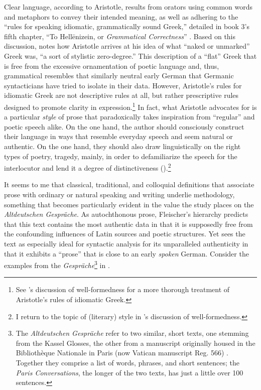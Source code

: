 \noindent Clear language, according to Aristotle, results from orators using common words and metaphors to convey their intended meaning, as well as adhering to the “rules for speaking idiomatic, grammatically sound Greek,” detailed in book 3’s fifth chapter, “To Hellēnizein, or \textit{Grammatical Correctness}” \citep[314--315]{Graff2005}. Based on this discussion, \citet[314]{Graff2005} notes how Aristotle arrives at his idea of what “naked or unmarked” Greek was, “a sort of stylistic zero-degree.” This description of a “flat” Greek that is free from the excessive ornamentation of poetic language and, thus, grammatical resembles that similarly neutral early German that Germanic syntacticians have tried to isolate in their data. However, Aristotle’s rules for idiomatic Greek are not descriptive rules at all, but rather prescriptive rules designed to promote clarity in expression.\footnote{{See ’s discussion of well-formedness for a more thorough treatment of Aristotle’s rules of idiomatic Greek.} } In fact, what Aristotle advocates for is a particular \textit{style} of prose that paradoxically takes inspiration from “regular” and poetic speech alike. On the one hand, the author should consciously construct their language in ways that resemble everyday speech and seem natural or authentic. On the one hand, they should also draw linguistically on the right types of poetry, tragedy, mainly, in order to defamiliarize the speech for the interlocutor and lend it a degree of distinctiveness (\citealt[314--315, 330--331, 333]{Graff2005}).\footnote{I return to the topic of (literary) style in ’s discussion of well-formedness.}\largerpage[2]

It seems to me that classical, traditional, and colloquial definitions that associate prose with ordinary or natural speaking and writing underlie  methodology, something that becomes particularly evident in the value the study places on the \textit{Altdeutschen Gespräche}. As autochthonous prose, Fleischer’s hierarchy predicts that this text contains the most authentic data in that it is supposedly free from the confounding influences of Latin sources and poetic structures. Yet \citet[28--29]{Fleischer2006} sees the text as especially ideal for syntactic analysis for its unparalleled authenticity in that it exhibits a “prose” that is close to an early \textit{spoken} German. Consider the examples from the \textit{Gespräche}\footnote{{The} {\textit{Altdeutschen Gespräche}} {refer to two similar, short texts, one stemming from the Kassel Glosses, the other from a manuscript originally housed in the Bibliothèque Nationale in Paris (now Vatican manuscript Reg. 566) \citep[101]{Bostock1976}. Together they comprise a list of words, phrases, and short sentences; the} {\textit{Paris Conversations}}{, the longer of the two texts, has just a little over 100 sentences.}} in .\largerpage[2]


